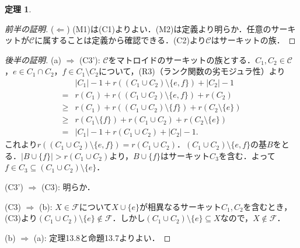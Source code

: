 \documentclass[xelatex,ja=standard,a4paper,14pt,everyparhook=compat]{bxjsarticle}
\theoremstyle{definition}
\newtheorem{theorem}{定理}[subsection]
\begin{document}
\begin{theorem}
\begin{proof}[\textup{前半の証明}]
        ($\Longleftarrow$) (M1)は(C1)よりよい．(M2)は定義より明らか．任意のサーキットが$\mathcal{C}$に属することは定義から確認できる．(C2)より$\mathcal{C}$はサーキットの族．
    \end{proof}
    \begin{proof}[\textup{後半の証明}]
        (a) $\Longrightarrow$ (C3'): $\mathcal{C}$をマトロイドのサーキットの族とする．$C_1, C_2 \in \mathcal{C}$，$e \in C_1 \cap C_2$，$f \in C_1 \setminus C_2$について，(R3)（ランク関数の劣モジュラ性）より \begin{align*}
            & |C_1| - 1 + r((C_1 \cup C_2) \setminus \{e,f\}) + |C_2| - 1 \\
            ={}& r(C_1) + r((C_1 \cup C_2) \setminus \{e,f\}) + r(C_2) \\
            \geq{}& r(C_1) + r((C_1 \cup C_2) \setminus \{f\}) + r(C_2 \setminus \{e\}) \\
            \geq{}& r(C_1 \setminus \{f\}) + r(C_1 \cup C_2) + r(C_2 \setminus \{e\}) \\
            ={}& |C_1| - 1 + r(C_1 \cup C_2) + |C_2| - 1.
        \end{align*}
        これより$r((C_1 \cup C_2) \setminus \{e,f\}) = r(C_1 \cup C_2)$．$(C_1 \cup C_2) \setminus \{e,f\}$の基$B$をとる．$|B \cup \{f\}| > r(C_1 \cup C_2)$より，$B \cup \{f\}$はサーキット$C_3$を含む．よって$f \in C_3 \subseteq (C_1 \cup C_2) \setminus \{e\}$．

        (C3') $\Longrightarrow$ (C3): 明らか．

        (C3) $\Longrightarrow$ (b): $X \in \mathcal{F}$について$X \cup \{e\}$が相異なるサーキット$C_1, C_2$を含むとき，(C3)より$(C_1 \cup C_2) \setminus \{e\} \notin \mathcal{F}$．しかし$(C_1 \cup C_2) \setminus \{e\} \subseteq X$なので，$X \notin \mathcal{F}$．

        (b) $\Longrightarrow$ (a): 定理13.8と命題13.7よりよい．
    \end{proof}
\end{theorem}
\end{document}
